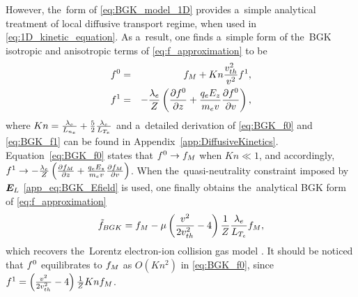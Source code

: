 However, the~form of \eqref{eq:BGK_model_1D} provides a~simple analytical 
treatment of local diffusive transport regime, when used in 
\eqref{eq:1D_kinetic_equation}. As a~result, one finds a~simple form of
the~BGK isotropic and anisotropic terms of \eqref{eq:f_approximation} to be
\begin{eqnarray}
  f^0 &=& f_M + Kn \frac{v_{th}^2}{v^2}f^1 ,
  \label{eq:BGK_f0} \\
  f^1 &=& - \frac{\lambda_e}{Z}
  \left( \frac{\partial{f^0}}{\partial{z}} + \frac{q_eE_z}{m_ev}\frac{\partial{f^0}}{\partial{v}} \right) , 
  \label{eq:BGK_f1}
\end{eqnarray}
where 
$Kn = \frac{\lambda_e}{L_{n_e}} + \frac{5}{2}\frac{\lambda_e}{L_{T_e}}$
and a~detailed derivation of \eqref{eq:BGK_f0} and \eqref{eq:BGK_f1} 
can be found in Appendix~\ref{app:DiffusiveKinetics}.
Equation~\eqref{eq:BGK_f0} states that $f^0\rightarrow f_M$ when $Kn\ll1$, and 
accordingly, $f^1 \rightarrow - \frac{\lambda_e}{Z}
\left( \frac{\partial{f_M}}{\partial{z}} + \frac{q_eE_z}{m_ev}\frac{\partial{f_M}}{\partial{v}} \right)$.
When the~quasi-neutrality constraint imposed by $\boldsymbol{E}_L$
\eqref{app_eq:BGK_Efield} is used, one finally obtains the~analytical BGK form 
of \eqref{eq:f_approximation}
\begin{equation}
  \tilde{f}_{BGK} = f_M - \mu 
  \left( \frac{v^2}{2 v_{th}^2} - 4\right)\frac{1}{Z}
  \frac{\lambda_e}{L_{T_e}}f_M , 
  \label{eq:BGK_approximation}
\end{equation}
which recovers the~Lorentz electron-ion collision gas model 
\cite{Lorentz_1905}. It should be noticed that $f^0$ equilibrates to $f_M$ 
as $O(Kn^2)$ in \eqref{eq:BGK_f0}, since 
$f^1 = \left( \frac{v^2}{2 v_{th}^2} - 4\right)\frac{1}{Z}
Kn f_M$.

